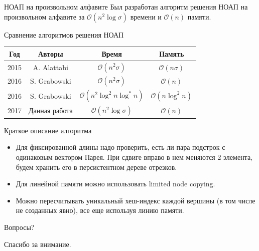 \documentclass[hyperref=unicode,graphics=pdflatex,12pt]{beamer}
\begin{document}
\begin{frame}{НОАП на произвольном алфавите}
Был разработан алгоритм решения НОАП на произвольном алфавите
за $\mathcal{O}(n^2 \log \sigma)$ времени и $\mathcal{O}(n)$ памяти.

\vspace{0.5cm}

Сравнение алгоритмов решения НОАП

\begin{center}
\begin{tabular}{|c|c|c|c|}
\hline
Год & Авторы & Время & Память \\
\hline
2015 & A. Alattabi & $\mathcal{O}(n^2 \sigma)$ & $\mathcal{O}(n \sigma)$ \\
\hline
2016 & S. Grabowski & $\mathcal{O}(n^2 \sigma)$ & $\mathcal{O}(n)$ \\
\hline
2016 & S. Grabowski & $\mathcal{O}(n^2 \log^2 n \log^* n)$ & $\mathcal{O}(n \log^2 n)$ \\
\hline
2017 & Данная работа & $\mathcal{O}(n^2 \log \sigma)$ & $\mathcal{O}(n)$ \\
\hline
\end{tabular}
\end{center}
\end{frame}
      
\begin{frame}{Краткое описание алгоритма}
\vspace{0.5cm}
\hspace{0.5cm}
\begin{itemize}
\item Для фиксированной длины надо проверить, есть ли пара подстрок с одинаковым вектором Парея. При сдвиге вправо в нем меняются 2 элемента, будем хранить его в персистентном дереве отрезков.
\item<2-> Для линейной памяти можно использовать limited node copying.
\item<3-> Можно пересчитывать уникальный хеш-индекс каждой вершины (в том числе не созданных явно), все еще используя линию памяти.
\end{itemize}
\end{frame}


\begin{frame}{Вопросы?}
\begin{center}
Спасибо за внимание.
\end{center}
\end{frame}
\end{document}
